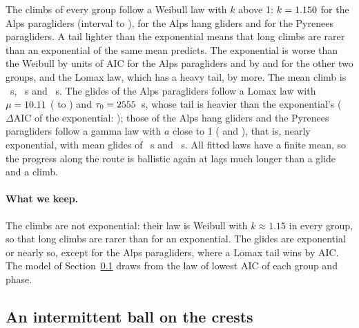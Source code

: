 \documentclass[11pt,a4paper]{article}
\begin{document}
The climbs of every group follow a Weibull law with $k$ above 1: $k = 1.150$ for the Alps paragliders (interval
\flPauseParamAAlpsParaLo{} to \flPauseParamAAlpsParaHi), \flPauseParamAAlpsHang{} for the Alps hang gliders and
\flPauseParamAPyrPara{} for the Pyrenees paragliders. A tail lighter than the exponential means that long climbs are rarer than
an exponential of the same mean predicts. The exponential is worse than the Weibull by \flPauseAicExpAlpsPara{} units of AIC for the
Alps paragliders and by \flPauseAicExpAlpsHang{} and \flPauseAicExpPyrPara{} for the other two groups, and the Lomax law, which
has a heavy tail, by more. The mean climb is \flPauseMeanAlpsPara~s, \flPauseMeanAlpsHang~s and \flPauseMeanPyrPara~s. The glides
of the Alps paragliders follow a Lomax law with $\mu = 10.11$ (\flGlideParamAAlpsParaLo{} to \flGlideParamAAlpsParaHi)
and $\tau_0 = 2555$~s, whose tail is heavier than the exponential's ($\Delta\mathrm{AIC}$ of the exponential:
\flGlideAicExpAlpsPara); those of the Alps hang gliders and the Pyrenees paragliders follow a gamma law with $a$ close to
1 (\flGlideParamAAlpsHang{} and \flGlideParamAPyrPara), that is, nearly exponential, with mean glides of \flGlideMeanAlpsHang~s and
\flGlideMeanPyrPara~s. All fitted laws have a finite mean, so the progress along the route is ballistic again at lags much longer
than a glide and a climb.

\paragraph{What we keep.} The climbs are not exponential: their law is Weibull with $k \approx 1.15$ in every group, so that
long climbs are rarer than for an exponential. The glides are exponential or nearly so, except for the Alps paragliders, where
a Lomax tail wins by AIC. The model of Section~\ref{sec:flmodel} draws from the law of lowest AIC of each group and phase.

\subsection{An intermittent ball on the crests}\label{sec:flmodel}
\end{document}
